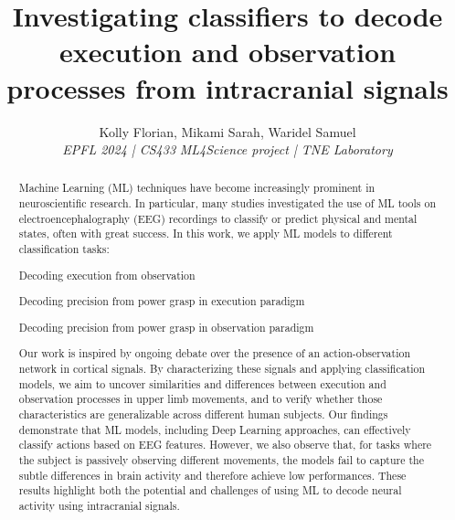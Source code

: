 \documentclass[10pt,conference,compsocconf]{IEEEtran}
\begin{document}
\title{Investigating classifiers to decode execution and observation processes from intracranial signals}

\author{
  Kolly Florian, Mikami Sarah, Waridel Samuel \\
  \textit{EPFL 2024 | CS433}
  \textit{ML4Science project | TNE Laboratory}
}

\maketitle



\begin{abstract}
    Machine Learning (ML) techniques have become increasingly prominent in neuroscientific research. In particular, many studies investigated the use of ML tools on electroencephalography (EEG) recordings to classify or predict physical and mental states, often with great success. In this work, we apply ML models to different classification tasks:
    \begin{mylist}
        \item Decoding execution from observation
        \item Decoding precision from power grasp in execution paradigm
        \item Decoding precision from power grasp in observation paradigm
    \end{mylist}
    Our work is inspired by ongoing debate over the presence of an action-observation network in cortical signals. By characterizing these signals and applying classification models, we aim to uncover similarities and differences between execution and observation processes in upper limb movements, and to verify whether those characteristics are generalizable across different human subjects. Our findings demonstrate that ML models, including Deep Learning approaches, can effectively classify actions based on EEG features. However, we also observe that, for tasks where the subject is passively observing different movements, the models fail to capture the subtle differences in brain activity and therefore achieve low performances. These results highlight both the potential and challenges of using ML to decode neural activity using intracranial signals.

\end{abstract}
\end{document}
